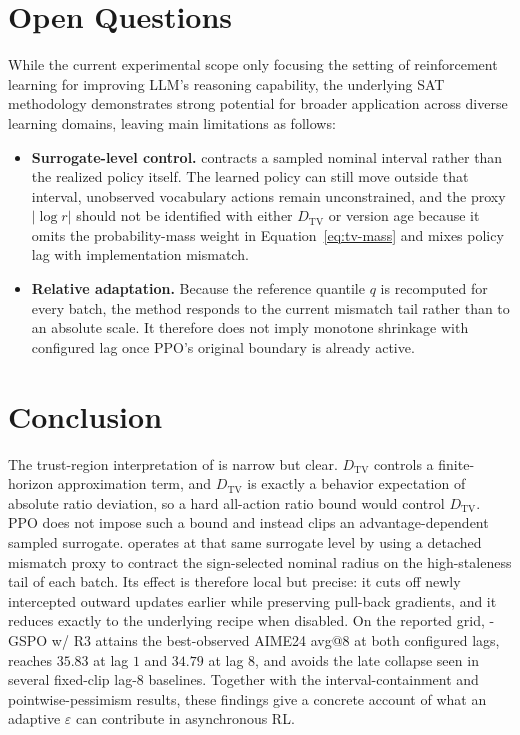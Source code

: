 \FloatBarrier
\fi

\section{Open Questions}
\label{sec:limitations}

While the current experimental scope only focusing the setting of reinforcement learning for improving LLM's reasoning capability, the underlying SAT methodology demonstrates strong potential for broader application across diverse learning domains, leaving main limitations as follows:
\begin{itemize}
\item \textbf{Surrogate-level control.} \satr{} contracts a sampled nominal interval rather than the realized policy itself. The learned policy can still move outside that interval, unobserved vocabulary actions remain unconstrained, and the proxy $|\log r|$ should not be identified with either $D_{\mathrm{TV}}$ or version age because it omits the probability-mass weight in Equation~\eqref{eq:tv-mass} and mixes policy lag with implementation mismatch.
\item \textbf{Relative adaptation.} Because the reference quantile $q$ is recomputed for every batch, the method responds to the current mismatch tail rather than to an absolute scale. It therefore does not imply monotone shrinkage with configured lag once PPO's original boundary is already active.
\end{itemize}

\section{Conclusion}
\label{sec:conclusion}

The trust-region interpretation of \satr{} is narrow but clear. $D_{\mathrm{TV}}$ controls a finite-horizon approximation term, and $D_{\mathrm{TV}}$ is exactly a behavior expectation of absolute ratio deviation, so a hard all-action ratio bound would control $D_{\mathrm{TV}}$. PPO does not impose such a bound and instead clips an advantage-dependent sampled surrogate. \satr{} operates at that same surrogate level by using a detached mismatch proxy to contract the sign-selected nominal radius on the high-staleness tail of each batch. Its effect is therefore local but precise: it cuts off newly intercepted outward updates earlier while preserving pull-back gradients, and it reduces exactly to the underlying recipe when disabled. On the reported grid, \satr-GSPO w/ R3 attains the best-observed AIME24 avg@8 at both configured lags, reaches $35.83$ at lag $1$ and $34.79$ at lag $8$, and avoids the late collapse seen in several fixed-clip lag-$8$ baselines. Together with the interval-containment and pointwise-pessimism results, these findings give a concrete account of what an adaptive $\varepsilon$ can contribute in asynchronous RL.
